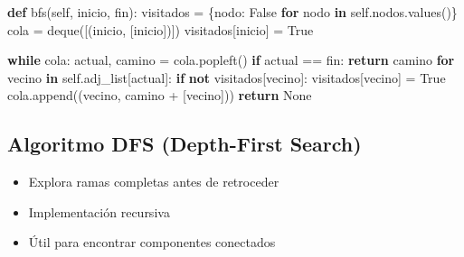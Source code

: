 \documentclass[
  spanish,
  letterpaper,
  DIV=11,
  numbers=noendperiod]{scrartcl}
\newenvironment{Shaded}{\begin{snugshade}}{\end{snugshade}}
\newcommand{\ControlFlowTok}[1]{\textcolor[rgb]{0.00,0.23,0.31}{\textbf{#1}}}
\newcommand{\KeywordTok}[1]{\textcolor[rgb]{0.00,0.23,0.31}{\textbf{#1}}}
\newcommand{\NormalTok}[1]{\textcolor[rgb]{0.00,0.23,0.31}{#1}}
\newcommand{\OperatorTok}[1]{\textcolor[rgb]{0.37,0.37,0.37}{#1}}
\newcommand{\VariableTok}[1]{\textcolor[rgb]{0.07,0.07,0.07}{#1}}
\begin{document}
\begin{Shaded}
\begin{Highlighting}[]

\KeywordTok{def}\NormalTok{ bfs(}\VariableTok{self}\NormalTok{, inicio, fin):}
\NormalTok{        visitados }\OperatorTok{=}\NormalTok{ \{nodo: }\VariableTok{False} \ControlFlowTok{for}\NormalTok{ nodo }\KeywordTok{in} \VariableTok{self}\NormalTok{.nodos.values()\}}
\NormalTok{        cola }\OperatorTok{=}\NormalTok{ deque([(inicio, [inicio])])}
\NormalTok{        visitados[inicio] }\OperatorTok{=} \VariableTok{True}

        \ControlFlowTok{while}\NormalTok{ cola:}
\NormalTok{            actual, camino }\OperatorTok{=}\NormalTok{ cola.popleft()}
            \ControlFlowTok{if}\NormalTok{ actual }\OperatorTok{==}\NormalTok{ fin:}
                \ControlFlowTok{return}\NormalTok{ camino}
            \ControlFlowTok{for}\NormalTok{ vecino }\KeywordTok{in} \VariableTok{self}\NormalTok{.adj\_list[actual]:}
                \ControlFlowTok{if} \KeywordTok{not}\NormalTok{ visitados[vecino]:}
\NormalTok{                    visitados[vecino] }\OperatorTok{=} \VariableTok{True}
\NormalTok{                    cola.append((vecino, camino }\OperatorTok{+}\NormalTok{ [vecino]))}
        \ControlFlowTok{return} \VariableTok{None}
\end{Highlighting}
\end{Shaded}

\subsection{Algoritmo DFS (Depth-First
Search)}\label{algoritmo-dfs-depth-first-search}

\begin{itemize}
\item
  Explora ramas completas antes de retroceder
\item
  Implementación recursiva
\item
  Útil para encontrar componentes conectados
\end{itemize}
\end{document}
